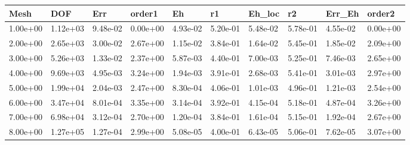 \begin{tabular}{llllllllll}
Mesh & DOF & Err & order1 & Eh & r1 & Eh_loc & r2 & Err_Eh & order2 \\ 
\hline 
1.00e+00 & 1.12e+03 & 9.48e-02 & 0.00e+00 & 4.93e-02 & 5.20e-01 & 5.48e-02 & 5.78e-01 & 4.55e-02 & 0.00e+00 \\ 
2.00e+00 & 2.65e+03 & 3.00e-02 & 2.67e+00 & 1.15e-02 & 3.84e-01 & 1.64e-02 & 5.45e-01 & 1.85e-02 & 2.09e+00 \\ 
3.00e+00 & 5.26e+03 & 1.33e-02 & 2.37e+00 & 5.87e-03 & 4.40e-01 & 7.00e-03 & 5.25e-01 & 7.46e-03 & 2.65e+00 \\ 
4.00e+00 & 9.69e+03 & 4.95e-03 & 3.24e+00 & 1.94e-03 & 3.91e-01 & 2.68e-03 & 5.41e-01 & 3.01e-03 & 2.97e+00 \\ 
5.00e+00 & 1.99e+04 & 2.04e-03 & 2.47e+00 & 8.30e-04 & 4.06e-01 & 1.01e-03 & 4.96e-01 & 1.21e-03 & 2.54e+00 \\ 
6.00e+00 & 3.47e+04 & 8.01e-04 & 3.35e+00 & 3.14e-04 & 3.92e-01 & 4.15e-04 & 5.18e-01 & 4.87e-04 & 3.26e+00 \\ 
7.00e+00 & 6.98e+04 & 3.12e-04 & 2.70e+00 & 1.20e-04 & 3.84e-01 & 1.61e-04 & 5.15e-01 & 1.92e-04 & 2.67e+00 \\ 
8.00e+00 & 1.27e+05 & 1.27e-04 & 2.99e+00 & 5.08e-05 & 4.00e-01 & 6.43e-05 & 5.06e-01 & 7.62e-05 & 3.07e+00 \\ 
\hline 
\end{tabular}